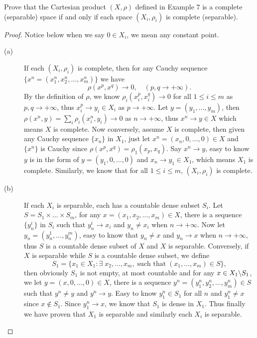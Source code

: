 \begin{pro}%
	Prove that the Cartesian product $(X,\rho)$ defined in Example $7$ is a complete (separable) space if and only if each space $(X_i,\rho_i)$ is complete (separable).
\end{pro}
\begin{proof}
	Notice below when we say $0\in X_i$, we mean any constant point.
	\begin{description}
		\item[(a)] If each $(X_i,\rho_i)$ is complete, then for any Cauchy sequence $\{x^n=(x_1^n,x_2^n,\dots,x_m^n)\}$ we have 
		\[\rho(x^p,x^q)\to 0,\quad (p,q\to +\infty).\]
		By the definition of $\rho$, we know $\rho_i(x_i^p,x_i^q)\to 0$ for all $1\leq i\leq m$ as $p,q\to +\infty$, thus $x_i^p \to y_i\in X_i$ as $p\to+\infty$. Let $y=(y_1,\dots,y_m)$, then $\rho(x^n,y)=\sum_i \rho_i(x_i^n,y_i)\to 0$ as $n\to+\infty$, thus $x^n\to y\in X$ which means $X$ is complete. Now conversely, assume $X$ is complete, then given any Cauchy sequence $\{x_n\}$ in $X_1$, just let $x^n=(x_n,0,\dots,0)\in X$ and $\{x^n\}$ is Cauchy since $\rho(x^p,x^q)=\rho_1(x_p,x_q)$. Say $x^n\to y$, easy to know $y$ is in the form of $y=(y_1,0,\dots,0)$ and $x_n\to y_1\in X_1$, which means $X_1$ is complete. Similarly, we know that for all $1\leq i\leq m$, $(X_i,\rho_i)$ is complete.
		\item[(b)] If each $X_i$ is separable, each has a countable dense subset $S_i$. Let $S=S_1\times\dots\times S_m$, for any $x=(x_1,x_2,\dots,x_m)\in X$, there is a sequence $\{y_n^i\}$ in $S_i$ such that $y_n^i\to x_i$ and $y_n\neq x_i$ when $n\to+\infty$. Now let $y_n=(y_n^1,\dots,y_n^m)$, easy to know that $y_n\neq x$ and $y_n\to x$ when $n\to +\infty$, thus $S$ is a countable dense subset of $X$ and $X$ is separable. Conversely, if $X$ is separable while $S$ is a countable dense subset, we define 
		\[S_1=\{x_1\in X_1\colon \exists\;x_2,\dots,x_m,\;\mbox{such that}\;(x_1,\dots,x_m)\in S\},\]
		then obviously $S_1$ is not empty, at most countable and for any $x\in X_1\backslash S_1$, we let $y=(x,0,\dots,0)\in X$, there is a sequence $y^n=(y_1^n,y_2^n,\dots,y_m^n)\in S$ such that $y^n\neq y$ and $y^n\to y$. Easy to know $y_1^n \in S_1$ for all $n$ and $y_1^n\neq x$ since $x\notin S_1$. Since $y_1^n\to x$, we know that $S_1$ is dense in $X_1$. Thus finally we have proven that $X_1$ is separable and similarly each $X_i$ is separable.
	\end{description}
\end{proof} 

